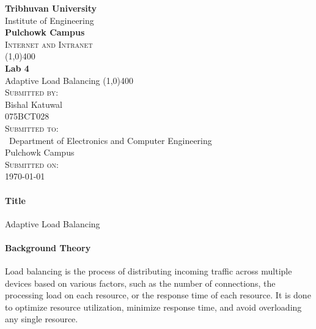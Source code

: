 \documentclass[12pt]{article}
\begin{document}
\begin{titlepage}
    \begin{center}
        \huge{\bfseries  Tribhuvan University}\\
        \Large{Institute of Engineering}\\
        \huge{ \bfseries  Pulchowk Campus}\\[3.2cm]


        \textsc{\Large Internet and Intranet}\\[-0.5cm]
        \line(1,0){400}\\
        \huge{\bfseries Lab 4}\\
        \large{Adaptive Load Balancing}
        \line(1,0){400}\\


        \textsc{\Large Submitted by:}\\
        \Large Bishal Katuwal\\ \large 075BCT028\\    [0.85cm]

        \textsc{\Large Submitted to:}\\\
        \large Department of Electronics and Computer Engineering\\Pulchowk Campus\\    [0.85cm]
        
        \textsc{\Large Submitted on:}\\
        \today
        
    \end{center}
\end{titlepage}
\pagebreak
\paragraph{\Large Title\\}
Adaptive Load Balancing

\paragraph{Background Theory\\}
Load balancing is the process of distributing incoming traffic across multiple devices based on various factors, such as the number of connections, the processing load on each resource, or the response time of each resource.
It is done to optimize resource utilization, minimize response time, and avoid overloading any single resource.
\end{document}
